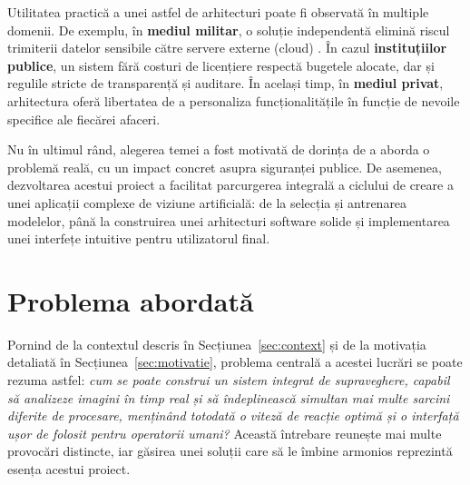 \documentclass[../../main.tex]{subfiles}
\begin{document}
Utilitatea practică a unei astfel de arhitecturi poate fi observată în multiple domenii. De exemplu, în \textbf{mediul militar}, o soluție independentă elimină riscul trimiterii datelor sensibile către servere externe (cloud) \cite{shafee_2025}. În cazul \textbf{instituțiilor publice}, un sistem fără costuri de licențiere respectă bugetele alocate, dar și regulile stricte de transparență și auditare. În același timp, în \textbf{mediul privat}, arhitectura oferă libertatea de a personaliza funcționalitățile în funcție de nevoile specifice ale fiecărei afaceri.

Nu în ultimul rând, alegerea temei a fost motivată de dorința de a aborda o problemă reală, cu un impact concret asupra siguranței publice. De asemenea, dezvoltarea acestui proiect a facilitat parcurgerea integrală a ciclului de creare a unei aplicații complexe de viziune artificială: de la selecția și antrenarea modelelor, până la construirea unei arhitecturi software solide și implementarea unei interfețe intuitive pentru utilizatorul final.

\section{Problema abordată}
\label{sec:problema}

Pornind de la contextul descris în Secțiunea~\ref{sec:context} și de la motivația detaliată în Secțiunea~\ref{sec:motivatie}, problema centrală a acestei lucrări se poate rezuma astfel: \emph{cum se poate construi un sistem integrat de supraveghere, capabil să analizeze imagini în timp real și să îndeplinească simultan mai multe sarcini diferite de procesare, menținând totodată o viteză de reacție optimă și o interfață ușor de folosit pentru operatorii umani?} Această întrebare reunește mai multe provocări distincte, iar găsirea unei soluții care să le îmbine armonios reprezintă esența acestui proiect.
\end{document}
